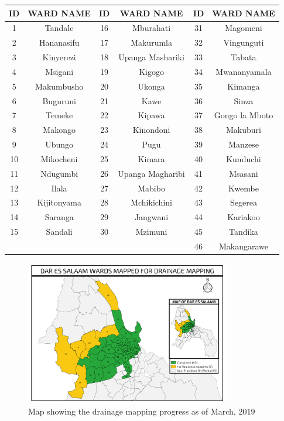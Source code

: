 \documentclass[a4paper,12pt,twoside]{article}
\begin{document}
\begin{center}
\begin{tabular}{|c|c|c|c|c|c|}
\hline
ID & WARD NAME & ID & WARD NAME & ID & WARD NAME\\
\hline
1 & Tandale & 16 & Mburahati & 31 & Magomeni\\
2 & Hananasifu & 17 & Makurumla & 32 & Vingunguti\\
3 & Kinyerezi & 18 & Upanga Mashariki & 33 & Tabata\\
4 & Msigani & 19 & Kigogo & 34 & Mwananyamala\\
5 & Makumbusho & 20 & Ukonga & 35 & Kimanga\\
6 & Buguruni & 21 & Kawe & 36 & Sinza\\
7 & Temeke & 22 & Kipawa & 37 & Gongo la Mboto\\
8 & Makongo & 23 & Kinondoni & 38 & Makuburi\\
9 & Ubungo & 24 & Pugu & 39 & Manzese\\
10 & Mikocheni & 25 & Kimara & 40 & Kunduchi\\
11 & Ndugumbi & 26 & Upanga Magharibi & 41 & Msasani\\
12 & Ilala & 27 & Mabibo & 42 & Kwembe\\
13 & Kijitonyama & 28 & Mchikichini & 43 & Segerea\\
14 & Saranga & 29 & Jangwani & 44 & Kariakoo\\
15 & Sandali & 30 & Mzimuni & 45 & Tandika\\
{} & {} & {} & {} & 46 & Makangarawe\\
 \hline
\end{tabular}
\end{center}

\begin{figure}[h]
  \caption{Map showing the drainage mapping progress as of March, 2019}
  \centering
  \includegraphics[width=0.8\textwidth]{images/Drain_Mapping.png}
\end{figure}
\end{document}
